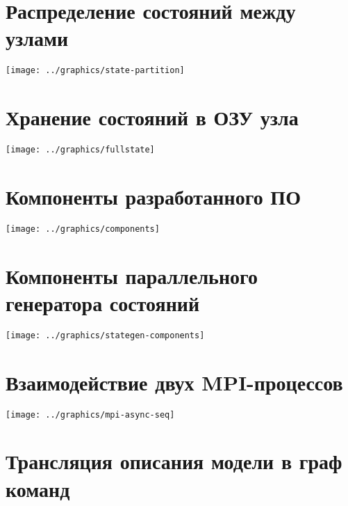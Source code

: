 \documentclass[12pt]{article}
\begin{document}
\section{Распределение состояний между узлами}
\label{sec:state-partitioning}

\begin{center}
  \texttt{[image: ../graphics/state-partition]}
\end{center}

\section{Хранение состояний в ОЗУ узла}
\label{sec:state-store-full}

\begin{center}
  \texttt{[image: ../graphics/fullstate]}
\end{center}

\section{Компоненты разработанного ПО}
\label{sec:component-diag}

\begin{center}
  \texttt{[image: ../graphics/components]}
\end{center}

\section{Компоненты параллельного генератора состояний}
\label{sec:component-diag}

\begin{center}
  \texttt{[image: ../graphics/stategen-components]}
\end{center}

\section{Взаимодействие двух MPI-процессов}
\label{sec:mpi-sequence}

\begin{center}
  \texttt{[image: ../graphics/mpi-async-seq]}
\end{center}

\section{Трансляция описания модели в граф команд}
\label{sec:pmlparse}
\end{document}
